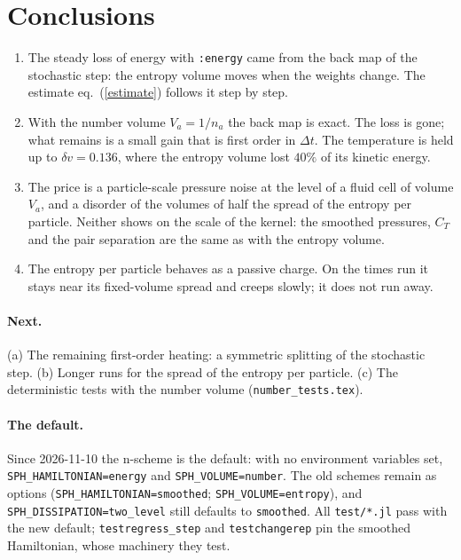 \documentclass[11pt,aps,preprint,nofootinbib,superscriptaddress,tightenlines]{revtex4-2}
\def\Eq#1{eq.~(\ref{#1})}
\let\oldparagraph\paragraph
\renewcommand{\paragraph}{\par\bigskip\oldparagraph}
\begin{document}
\section{Conclusions}
\label{sec:concl}

\begin{enumerate}
\item The steady loss of energy with \texttt{:energy} came from the back map of the
  stochastic step: the entropy volume moves when the weights change.  The estimate
  \Eq{estimate} follows it step by step.
\item With the number volume $V_a=1/n_a$ the back map is exact.  The loss is gone; what
  remains is a small gain that is first order in $\Delta t$.  The temperature is held up to
  $\delta v=0.136$, where the entropy volume lost $40\%$ of its kinetic energy.
\item The price is a particle-scale pressure noise at the level of a fluid cell of volume
  $V_a$, and a disorder of the volumes of half the spread of the entropy per particle.
  Neither shows on the scale of the kernel: the smoothed pressures, $C_T$ and the pair
  separation are the same as with the entropy volume.
\item The entropy per particle behaves as a passive charge.  On the times run it stays near
  its fixed-volume spread and creeps slowly; it does not run away.
\end{enumerate}

\paragraph{Next.}  (a) The remaining first-order heating: a symmetric splitting of the
stochastic step.  (b) Longer runs for the spread of the entropy per particle.  (c) The
deterministic tests with the number volume (\texttt{number\_tests.tex}).  

\paragraph{The default.}  Since 2026-11-10 the n-scheme is the default: with no environment
variables set, \texttt{SPH\_HAMILTONIAN=energy} and \texttt{SPH\_VOLUME=number}.  The old schemes
remain as options (\texttt{SPH\_HAMILTONIAN=smoothed}; \texttt{SPH\_VOLUME=entropy}), and
\texttt{SPH\_DISSIPATION=two\_level} still defaults to \texttt{smoothed}.  All \texttt{test/*.jl}
pass with the new default; \texttt{testregress\_step} and \texttt{testchangerep} pin the
smoothed Hamiltonian, whose machinery they test.
\end{document}
